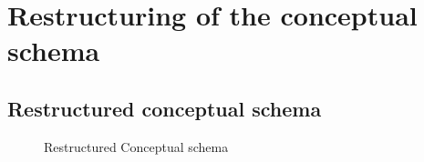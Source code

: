 
\section{Restructuring of the conceptual schema}

\subsection{Restructured conceptual schema}\label{RestructuredConceptualSchema}
\vspace{12px}

\begin{figure}[H]
  \centerline{}
  \caption{Restructured Conceptual schema}
\end{figure}


\pagebreak


